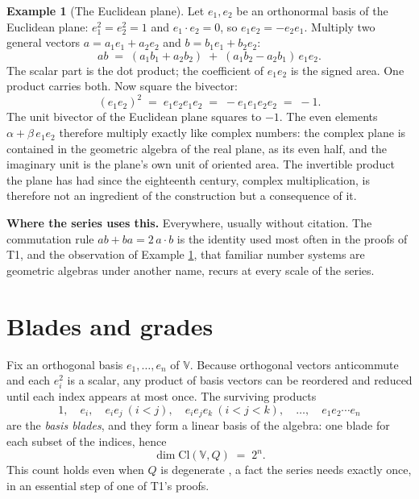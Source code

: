 \documentclass[11pt]{article}
\theoremstyle{definition}
\newtheorem{example}[theorem]{Example}
\theoremstyle{plain}
\providecommand{\Cl}{}\renewcommand{\Cl}{\mathrm{Cl}}
\begin{document}
\begin{example}[The Euclidean plane]\label{c:note.primer.euclidean-plane}
Let $e_1, e_2$ be an orthonormal basis of the Euclidean plane: $e_1^{2} = e_2^{2} = 1$ and $e_1 \cdot e_2 = 0$, so $e_1 e_2 = -e_2 e_1$. Multiply two general vectors $a = a_1 e_1 + a_2 e_2$ and $b = b_1 e_1 + b_2 e_2$:
\[
ab \;=\; (a_1 b_1 + a_2 b_2) \;+\; (a_1 b_2 - a_2 b_1)\, e_1 e_2 .
\]
The scalar part is the dot product; the coefficient of $e_1 e_2$ is the signed area. One product carries both. Now square the bivector:
\[
(e_1 e_2)^{2} \;=\; e_1 e_2 e_1 e_2 \;=\; - e_1 e_1 e_2 e_2 \;=\; -1 .
\]
The unit bivector of the Euclidean plane squares to $-1$. The even elements $\alpha + \beta\, e_1 e_2$ therefore multiply exactly like complex numbers: the complex plane is contained in the geometric algebra of the real plane, as its even half, and the imaginary unit is the plane's own unit of oriented area. The invertible product the plane has had since the eighteenth century, complex multiplication, is therefore not an ingredient of the construction but a consequence of it.
\end{example}

\label{c:note.primer.setting-products-vectors-one-rule-6}
\textbf{Where the series uses this.} Everywhere, usually without citation. The commutation rule $ab + ba = 2\,a\cdot b$ is the identity used most often in the proofs of T1, and the observation of Example \ref{c:note.primer.euclidean-plane}, that familiar number systems are geometric algebras under another name, recurs at every scale of the series.

\section{Blades and grades}

\label{c:note.primer.setting-blades-grades}
Fix an orthogonal basis $e_1, \dots, e_n$ of $\mathbb{V}$. Because orthogonal vectors anticommute and each $e_i^{2}$ is a scalar, any product of basis vectors can be reordered and reduced until each index appears at most once. The surviving products
\[
1, \quad e_i, \quad e_i e_j \ (i<j), \quad e_i e_j e_k \ (i<j<k), \quad \dots, \quad e_1 e_2 \cdots e_n
\]
are the \emph{basis blades}, and they form a linear basis of the algebra: one blade for each subset of the indices, hence
\[
\dim \Cl(\mathbb{V}, Q) \;=\; 2^{n} .
\]
This count holds even when $Q$ is degenerate \cite{Chevalley1997}, a fact the series needs exactly once, in an essential step of one of T1's proofs.
\end{document}
